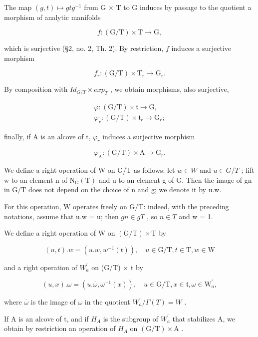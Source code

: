 The map \((g,t)\mapsto gtg^{-1}\) from G × T to G induces by passage to the quotient a morphism of analytic manifolds

\[
f: (\mathrm{G} / \mathrm{T}) \times \mathrm{T} \to \mathrm{G},
\]

which is surjective (§2, no. 2, Th. 2). By restriction, \(f\) induces a surjective morphism

\[
f _ {r}: (\mathrm{G} / \mathrm{T}) \times \mathrm{T} _ {r} \rightarrow \mathrm{G} _ {r}.
\]

By composition with \(Id_{G/T} \times exp_{T}\) , we obtain morphisms, also surjective,

\[
\begin{array}{c} \varphi : (\mathrm{G/T}) \times \mathfrak {t} \to \mathrm{G}, \\ \varphi_ {r}: (\mathrm{G/T}) \times \mathfrak {t} _ {r} \to \mathrm{G} _ {r}; \end{array}
\]

finally, if A is an alcove of t, \(\varphi_{r}\) induces a surjective morphism

\[
\varphi_ {\mathrm{A}}: (\mathrm{G/T}) \times \mathrm{A} \to \mathrm{G} _ {r}.
\]

We define a right operation of W on G/T as follows: let \(w \in W\) and \(u \in G/T\) ; lift w to an element n of \(\mathrm{N}_{\mathrm{G}}(\mathrm{T})\) and u to an element g of G. Then the image of gn in G/T does not depend on the choice of n and g; we denote it by u.w.

For this operation, W operates freely on G/T: indeed, with the preceding notations, assume that u.w = u; then \(gn \in gT\) , so \(n \in T\) and w = 1.

We define a right operation of W on \((\mathrm{G}/\mathrm{T}) \times \mathrm{T}\) by

\[
(u, t). w = (u. w, w ^ {- 1} (t)), \quad u \in \mathrm{G} / \mathrm{T}, t \in \mathrm{T}, w \in \mathrm{W}
\]

and a right operation of \(W_{a}^{\prime}\) on (G/T) × t by

\[
(u, x). \omega = (u. \overline {{\omega}}, \omega^ {- 1} (x)), \quad u \in \mathrm{G/T}, x \in \mathfrak {t}, \omega \in \mathrm{W} _ {a} ^ {\prime},
\]

where \(\overline{\omega}\) is the image of \(\omega\) in the quotient \(W_{a}^{\prime}/\Gamma(T)=W\) .

If A is an alcove of t, and if \(H_{A}\) is the subgroup of \(W_{a}^{\prime}\) that stabilizes A, we obtain by restriction an operation of \(H_{A}\) on \((\mathrm{G}/\mathrm{T}) \times \mathrm{A}\) .

